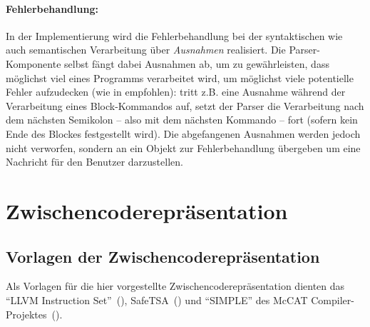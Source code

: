 \documentclass[twoside,a4paper,fleqn,12pt]{book}
\begin{document}
\paragraph{Fehlerbehandlung:}
In der Implementierung wird die Fehlerbehandlung bei der syntaktischen wie auch semantischen Verarbeitung über \emph{Ausnahmen}
realisiert. Die Parser-Komponente selbst fängt dabei Ausnahmen ab, um zu gewährleisten, dass möglichst viel eines
Programms verarbeitet wird, um möglichst viele potentielle Fehler aufzudecken (wie in \cite{wirth_compiler} empfohlen):
tritt z.B. eine Ausnahme während der Verarbeitung eines Block-Kommandos auf, setzt der Parser die
Verarbeitung nach dem nächsten Semikolon -- also mit dem nächsten Kommando -- fort (sofern kein Ende
des Blockes festgestellt wird).
Die abgefangenen Ausnahmen werden jedoch nicht verworfen, sondern an ein Objekt zur Fehlerbehandlung
übergeben um eine Nachricht für den Benutzer darzustellen.



\section{Zwischencoderepräsentation}
\label{zcr}




\subsection{Vorlagen der Zwischencoderepräsentation}

Als Vorlagen für die hier vorgestellte Zwischencoderepräsentation dienten das ``LLVM Instruction Set''~(\cite{LLVM:CGO04}),
SafeTSA~(\cite{SafeTSA}) und ``SIMPLE'' des McCAT Compiler-Projektes~(\cite{SIMPLE}).
\end{document}
